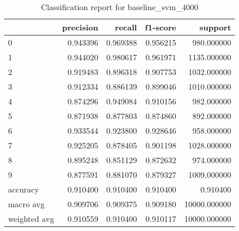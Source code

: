 \begin{table}[htb!]
\centering
\caption{Classification report for baseline_svm_4000}
\label{tab:classification-report-baseline_svm_4000}
\begin{tabular}{lrrrr}
\toprule
 & precision & recall & f1-score & support \\
\midrule
0 & 0.943396 & 0.969388 & 0.956215 & 980.000000 \\
1 & 0.944020 & 0.980617 & 0.961971 & 1135.000000 \\
2 & 0.919483 & 0.896318 & 0.907753 & 1032.000000 \\
3 & 0.912334 & 0.886139 & 0.899046 & 1010.000000 \\
4 & 0.874296 & 0.949084 & 0.910156 & 982.000000 \\
5 & 0.871938 & 0.877803 & 0.874860 & 892.000000 \\
6 & 0.933544 & 0.923800 & 0.928646 & 958.000000 \\
7 & 0.925205 & 0.878405 & 0.901198 & 1028.000000 \\
8 & 0.895248 & 0.851129 & 0.872632 & 974.000000 \\
9 & 0.877591 & 0.881070 & 0.879327 & 1009.000000 \\
accuracy & 0.910400 & 0.910400 & 0.910400 & 0.910400 \\
macro avg & 0.909706 & 0.909375 & 0.909180 & 10000.000000 \\
weighted avg & 0.910559 & 0.910400 & 0.910117 & 10000.000000 \\
\bottomrule
\end{tabular}
\end{table}

